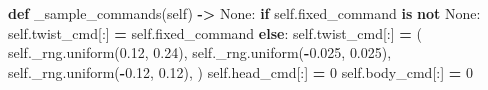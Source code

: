 \documentclass[
  american,
  11pt,
  letterpaper,
]{article}
\newenvironment{Shaded}{\begin{snugshade}}{\end{snugshade}}
\newcommand{\ControlFlowTok}[1]{\textcolor[rgb]{0.13,0.29,0.53}{\textbf{#1}}}
\newcommand{\DecValTok}[1]{\textcolor[rgb]{0.00,0.00,0.81}{#1}}
\newcommand{\FloatTok}[1]{\textcolor[rgb]{0.00,0.00,0.81}{#1}}
\newcommand{\KeywordTok}[1]{\textcolor[rgb]{0.13,0.29,0.53}{\textbf{#1}}}
\newcommand{\NormalTok}[1]{#1}
\newcommand{\OperatorTok}[1]{\textcolor[rgb]{0.81,0.36,0.00}{\textbf{#1}}}
\newcommand{\VariableTok}[1]{\textcolor[rgb]{0.00,0.00,0.00}{#1}}
\renewenvironment{Shaded}{\par\smallskip}{\par\smallskip}
\begin{document}
\begin{Shaded}
\begin{Highlighting}[]
    \KeywordTok{def}\NormalTok{ \_sample\_commands(}\VariableTok{self}\NormalTok{) }\OperatorTok{{-}\textgreater{}} \VariableTok{None}\NormalTok{:}
        \ControlFlowTok{if} \VariableTok{self}\NormalTok{.fixed\_command }\KeywordTok{is} \KeywordTok{not} \VariableTok{None}\NormalTok{:}
            \VariableTok{self}\NormalTok{.twist\_cmd[:] }\OperatorTok{=} \VariableTok{self}\NormalTok{.fixed\_command}
        \ControlFlowTok{else}\NormalTok{:}
            \VariableTok{self}\NormalTok{.twist\_cmd[:] }\OperatorTok{=}\NormalTok{ (}
                \VariableTok{self}\NormalTok{.\_rng.uniform(}\FloatTok{0.12}\NormalTok{, }\FloatTok{0.24}\NormalTok{),}
                \VariableTok{self}\NormalTok{.\_rng.uniform(}\OperatorTok{{-}}\FloatTok{0.025}\NormalTok{, }\FloatTok{0.025}\NormalTok{),}
                \VariableTok{self}\NormalTok{.\_rng.uniform(}\OperatorTok{{-}}\FloatTok{0.12}\NormalTok{, }\FloatTok{0.12}\NormalTok{),}
\NormalTok{            )}
        \VariableTok{self}\NormalTok{.head\_cmd[:] }\OperatorTok{=} \DecValTok{0}
        \VariableTok{self}\NormalTok{.body\_cmd[:] }\OperatorTok{=} \DecValTok{0}


\end{Highlighting}
\end{Shaded}
\end{document}
